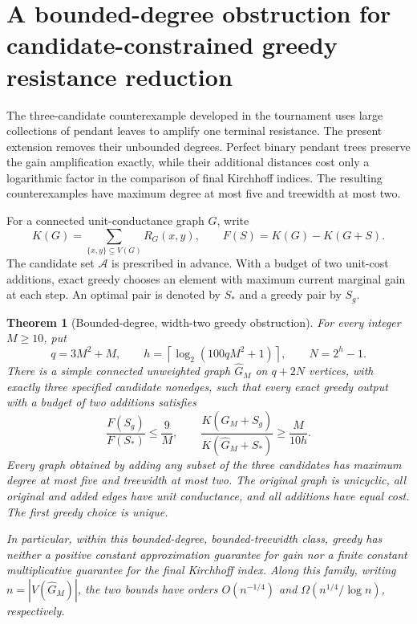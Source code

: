 \documentclass[11pt,a4paper]{article}
\newtheorem{theorem}{Theorem}[section]
\theoremstyle{definition}\newtheorem{definition}[theorem]{Definition}
\theoremstyle{remark}\newtheorem{remark}[theorem]{Remark}
\numberwithin{equation}{section}
\begin{document}
\clearpage
{}
\section{A bounded-degree obstruction for candidate-constrained greedy resistance reduction}
\label{ext-taisho-section}

The three-candidate counterexample developed in the tournament uses large
collections of pendant leaves to amplify one terminal resistance.  The present
extension removes their unbounded degrees.  Perfect binary pendant trees preserve
the gain amplification exactly, while their additional distances cost only a
logarithmic factor in the comparison of final Kirchhoff indices.  The resulting
counterexamples have maximum degree at most five and treewidth at most two.

For a connected unit-conductance graph $G$, write
\[
 K(G)=\sum_{\{x,y\}\subseteq V(G)}R_G(x,y),\qquad
 F(S)=K(G)-K(G+S).
\]
The candidate set $\mathcal A$ is prescribed in advance.  With a budget of two
unit-cost additions, exact greedy chooses an element with maximum current
marginal gain at each step.  An optimal pair is denoted by $S_*$ and a greedy
pair by $S_g$.

\begin{theorem}[Bounded-degree, width-two greedy obstruction]
\label{ext-taisho-main}
For every integer $M\ge10$, put
\[
 q=3M^2+M,\qquad
 h=\left\lceil\log_2(100qM^2+1)\right\rceil,\qquad N=2^h-1.
\]
There is a simple connected unweighted graph $\widehat G_M$ on $q+2N$ vertices,
with exactly three specified candidate nonedges, such that every exact greedy
output with a budget of two additions satisfies
\[
 \frac{F(S_g)}{F(S_*)}\le\frac9M,
 \qquad
 \frac{K(\widehat G_M+S_g)}{K(\widehat G_M+S_*)}
 \ge\frac{M}{10h}.
\]
Every graph obtained by adding any subset of the three candidates has maximum
degree at most five and treewidth at most two.  The original graph is unicyclic,
all original and added edges have unit conductance, and all additions have equal
cost.  The first greedy choice is unique.

In particular, within this bounded-degree, bounded-treewidth class, greedy has
neither a positive constant approximation guarantee for gain nor a finite
constant multiplicative guarantee for the final Kirchhoff index.  Along this
family, writing $n=|V(\widehat G_M)|$, the two bounds have orders
$O(n^{-1/4})$ and $\Omega(n^{1/4}/\log n)$, respectively.
\end{theorem}
\end{document}
